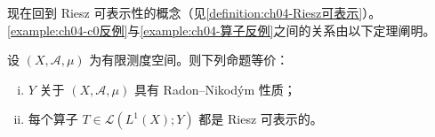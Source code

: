 \documentclass[../../main.tex]{subfiles}%
\begin{document}
现在回到 Riesz 可表示性的概念（见\cref{definition:ch04-Riesz可表示}）。\cref{example:ch04-c0反例}与\cref{example:ch04-算子反例}之间的关系由以下定理阐明。

\begin{theorem}\label{theorem:ch04-RNP与可表示}
设 $(X,\mathcal{A},\mu)$ 为有限测度空间。则下列命题等价：
\begin{enumerate}[(i)]
\item\label{item:ch04-RNP与可表示-i} $Y$ 关于 $(X,\mathcal{A},\mu)$ 具有 Radon--Nikodým 性质；
\item\label{item:ch04-RNP与可表示-ii} 每个算子 $T\in\mathcal{L}(L^1(X);Y)$ 都是 Riesz 可表示的。
\end{enumerate}
\end{theorem}

\end{document}
